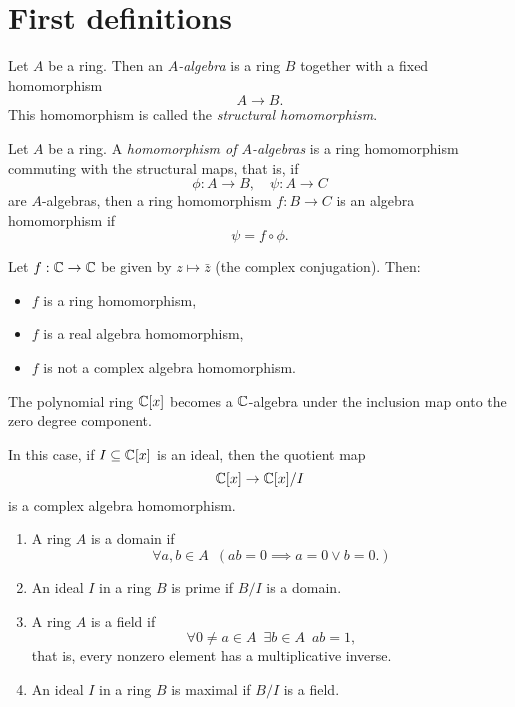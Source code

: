 \section{First definitions}

\begin{df}
  Let $A$ be a ring. Then an \textit{$A$-algebra} is a ring $B$ together with a fixed homomorphism
  \[A \to B.\]
  This homomorphism is called the \textit{structural homomorphism}.
\end{df}

\begin{df}
  Let $A$ be a ring. A \textit{homomorphism of $A$-algebras} is a ring homomorphism commuting with the structural maps, that is, if
  \[ \phi: A \to B, \quad \psi: A \to C\]
  are $A$-algebras, then a ring homomorphism
  $f:B \to C$
  is an algebra homomorphism if
  \[\psi = f \circ \phi.\]
\end{df}

\begin{example}
  Let $f: \mathbb C \to \mathbb C$ be given by $z \mapsto \bar z$ (the complex conjugation). Then:
\begin{itemize}
\item \(f\) is a ring homomorphism,
\item \(f\) is a real algebra homomorphism,
\item \(f\) is not a complex algebra homomorphism.
\end{itemize}
\end{example}

\begin{example}
  The polynomial ring $\mathbb C [x]$ becomes a $\mathbb C$-algebra under the inclusion map onto the zero degree component.

  In this case, if $I \subseteq \mathbb C[x]$ is an ideal, then 
  the quotient map
  \[ \mathbb C[x] \to \mathbb C[x]/{I}\]
  is a complex algebra homomorphism.
\end{example}

\begin{df}
\mbox{}
\begin{enumerate}
\item A ring $A$ is a domain if
  \[\forall a,b \in A \enspace ( ab = 0 \implies a = 0 \lor b = 0. )\]
\item An ideal $I$ in a ring $B$ is prime if $B/{I}$ is a domain.
\item A ring $A$ is a field if
  \[\forall 0 \neq a \in A \enspace \exists b \in A \enspace ab = 1,\] that is, every nonzero element has a multiplicative inverse.
\item An ideal $I$ in a ring $B$ is maximal if $B/{I}$ is a field.
\end{enumerate}
\end{df}

